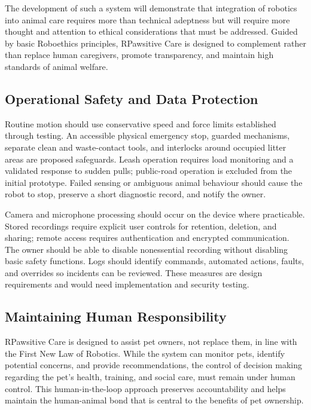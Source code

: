 \documentclass[conference,letterpaper]{IEEEtran}
\begin{document}
The development of such a system will demonstrate that integration of robotics into animal care requires more than technical adeptness but will require more thought and attention to ethical considerations that must be addressed. Guided by basic Roboethics principles, RPawsitive Care is designed to complement rather than replace human caregivers, promote transparency, and maintain high standards of animal welfare.

\subsection{Operational Safety and Data Protection}

Routine motion should use conservative speed and force limits established through testing. An accessible physical emergency stop, guarded mechanisms, separate clean and waste-contact tools, and interlocks around occupied litter areas are proposed safeguards. Leash operation requires load monitoring and a validated response to sudden pulls; public-road operation is excluded from the initial prototype. Failed sensing or ambiguous animal behaviour should cause the robot to stop, preserve a short diagnostic record, and notify the owner.

Camera and microphone processing should occur on the device where practicable. Stored recordings require explicit user controls for retention, deletion, and sharing; remote access requires authentication and encrypted communication. The owner should be able to disable nonessential recording without disabling basic safety functions. Logs should identify commands, automated actions, faults, and overrides so incidents can be reviewed. These measures are design requirements and would need implementation and security testing.

\subsection{Maintaining Human Responsibility}

RPawsitive Care is designed to assist pet owners, not replace them, in line with the First New Law of Robotics. While the system can monitor pets, identify potential concerns, and provide recommendations, the control of decision making regarding the pet’s health, training, and social care, must remain under human control. This human-in-the-loop approach preserves accountability and helps maintain the human-animal bond that is central to the benefits of pet ownership.
\end{document}
